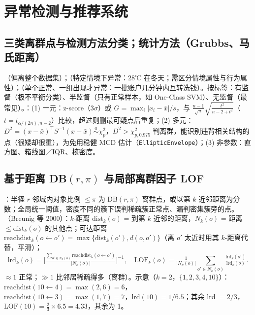 \section{异常检测与推荐系统}

\subsection{三类离群点与检测方法分类；统计方法（Grubbs、马氏距离）}
（偏离整个数据集）；（特定情境下异常：28℃ 在冬天；需区分情境属性与行为属性）；（单个正常、一组出现才异常：一批账户几分钟内互转洗钱）。按标签：有监督（极不平衡分类）、半监督（只有正常样本，如 One-Class SVM）、无监督（最常见）。：(1) 一元：z-score（3$\sigma$）或  $G=\max_i|x_i-\bar x|/s$，与 $\frac{n-1}{\sqrt n}\sqrt{\frac{t^2}{n-2+t^2}}$（$t=t_{\alpha/(2n),n-2}$）比较，超过则删最可疑点后重复；(2) 多元：$D^2=(x-\bar x)^\top S^{-1}(x-\bar x)\overset{a}{\sim}\chi^2_p$，$D^2>\chi^2_{p,0.975}$ 判离群，能识别违背相关结构的点（很矮却很重），为免用稳健 MCD 估计（\texttt{EllipticEnvelope}）；(3) 非参数：直方图、箱线图／IQR、核密度。

\subsection{基于距离 DB\texorpdfstring{$(r,\pi)$}{(r,pi)} 与局部离群因子 LOF}
：半径 $r$ 邻域内对象比例 $\le\pi$ 为 DB$(r,\pi)$ 离群点，或以第 $k$ 近邻距离为分数；全局统一阈值，密度不同的簇下误判稀疏簇正常点、漏判密集簇旁的点。（Breunig 等 2000）：$k$-距离 $\mathrm{dist}_k(o)$ = 到第 $k$ 近邻的距离，$N_k(o)$ = 距离 $\le\mathrm{dist}_k(o)$ 的其他点；可达距离 $\mathrm{reachdist}_k(o\leftarrow o')=\max\{\mathrm{dist}_k(o'),d(o,o')\}$（离 $o'$ 太近时用其 $k$-距离代替，平滑）；
\[\mathrm{lrd}_k(o)=\Big[\tfrac{\sum_{o'\in N_k(o)}\mathrm{reachdist}_k(o\leftarrow o')}{|N_k(o)|}\Big]^{-1},\quad \mathrm{LOF}_k(o)=\tfrac1{|N_k(o)|}\sum_{o'\in N_k(o)}\tfrac{\mathrm{lrd}_k(o')}{\mathrm{lrd}_k(o)}.\]
$\approx1$ 正常；$\gg1$ 比邻居稀疏得多（离群）。示意（$k=2$，$\{1,2,3,4,10\}$）：$\mathrm{reachdist}(10\leftarrow4)=\max(2,6)=6$，$\mathrm{reachdist}(10\leftarrow3)=\max(1,7)=7$，$\mathrm{lrd}(10)=1/6.5$；其余 lrd $=2/3$，$\mathrm{LOF}(10)=\frac23\times6.5=4.33$，其余为 1。

